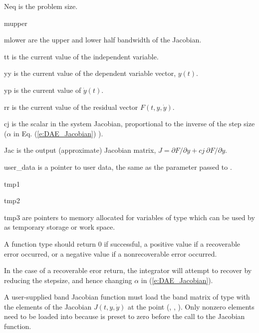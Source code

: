 {{}
{
  \begin{args}
  \item[Neq]
    is the problem size.
  \item[mupper]
  \item[mlower]
    are the upper and lower half bandwidth of the Jacobian.
  \item[tt]
    is the current value of the independent variable.
  \item[yy]
    is the current value of the dependent variable vector, $y(t)$.
  \item[yp]
    is the current value of $\dot{y}(t)$.
  \item[rr]
    is the current value of the residual vector $F(t,y,\dot{y})$.
  \item[cj]
    is the scalar in the system Jacobian, proportional to the inverse of the
    step size ($\alpha$ in Eq. (\ref{e:DAE_Jacobian}) ).
  \item[Jac]
    is the output (approximate) Jacobian matrix,
    $J = \partial{F}/\partial{y} + cj ~ \partial{F}/\partial{\dot{y}}$.
    \item[user\_data]
    is a pointer to user data, the same as the       
    parameter passed to .   
  \item[tmp1]
  \item[tmp2]
  \item[tmp3]
    are pointers to memory allocated for variables of type  
    which can be used by  as temporary storage or work space.    
  \end{args}
}
{
  A  function type should return $0$ if successful,
  a positive value if a recoverable error occurred, or a negative value
  if a nonrecoverable error occurred. 

  In the case of a recoverable eror return, 
  the integrator will attempt to recover by reducing the stepsize,
  and hence changing $\alpha$ in (\ref{e:DAE_Jacobian}).
}
{
  A user-supplied band Jacobian function must load the band matrix 
  of type  with the elements of the Jacobian $J(t,y,\dot{y})$ at the
  point (, , ).  Only nonzero elements need to be loaded into
   because  is preset to zero before the call to the
  Jacobian function.  

}}
